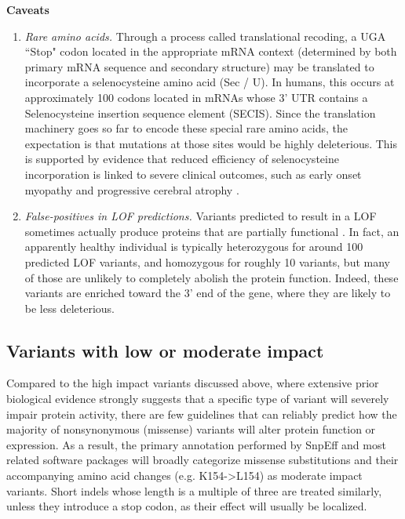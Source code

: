 \textbf{Caveats}
	\begin{enumerate}[label=\roman*]
	
	\item \textit{Rare amino acids.} Through a process called translational recoding, a UGA ``Stop" codon located in the appropriate mRNA context (determined by both primary mRNA sequence and secondary structure) may be translated to incorporate a selenocysteine amino acid (Sec / U). In humans, this occurs at approximately 100 codons located in mRNAs whose 3’ UTR contains a Selenocysteine insertion sequence element (SECIS). Since the translation machinery goes so far to encode these special rare amino acids, the expectation is that mutations at those sites would be highly deleterious. This is supported by evidence that reduced efficiency of selenocysteine incorporation is linked to severe clinical outcomes, such as early onset myopathy  \cite{maiti2009mutation} and progressive cerebral atrophy  \cite{agamy2010mutations}.
	
	\item \textit{False-positives in LOF predictions.} Variants predicted to result in a LOF sometimes actually produce proteins that are partially functional  \cite{macarthur2012systematic}. In fact, an apparently healthy individual is typically heterozygous for around 100 predicted LOF variants, and homozygous for roughly 10 variants, but many of those are unlikely to completely abolish the protein function. Indeed, these variants are enriched toward the 3’ end of the gene, where they are likely to be less deleterious. 
	
	\end{enumerate}

\subsection{Variants with low or moderate impact}

Compared to the high impact variants discussed above, where extensive prior biological evidence strongly suggests that a specific type of variant will severely impair protein activity, there are few guidelines that can reliably predict how the majority of nonsynonymous (missense) variants will alter protein function or expression. As a result, the primary annotation performed by SnpEff and most related software packages will broadly categorize missense substitutions and their accompanying amino acid changes (e.g. K154->L154) as moderate impact variants. Short indels whose length is a multiple of three are treated similarly, unless they introduce a stop codon, as their effect will usually be localized.

